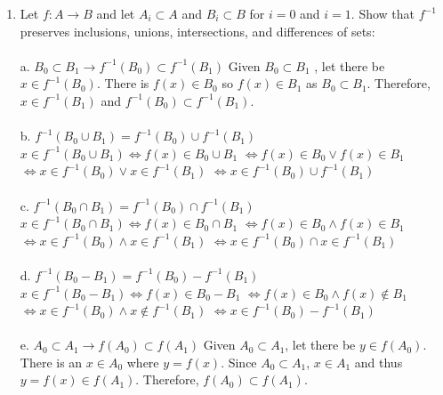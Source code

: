 \documentclass[]{article}
\begin{document}
\begin{enumerate}
    \item Let $f: A \rightarrow B$ and let $A_i \subset A$ and $B_i \subset B$ for $i=0$ and $i=1$. Show that $f^{-1}$ preserves inclusions, unions, intersections, and differences of sets:
    \\\\a. $B_0 \subset B_1 \rightarrow f^{-1}(B_0) \subset f^{-1}(B_1)$
    \newline Given $B_0 \subset B_1$ , let there be $x \in f^{-1}(B_0)$. There is $f(x) \in B_0$ so $f(x) \in B_1$ as $B_0 \subset B_1$. Therefore, $x \in f^{-1}(B_1)$ and $f^{-1}(B_0) \subset f^{-1}(B_1)$.
    \\\\b. $f^{-1}(B_0 \cup B_1) = f^{-1}(B_0) \cup f^{-1}(B_1)$
    \newline $x \in f^{-1}(B_0 \cup B_1) \iff f(x) \in B_0 \cup B_1$
    \newline $ \iff f(x) \in B_0 \lor f(x) \in B_1$
    \newline $\iff x \in f^{-1}(B_0) \lor x \in f^{-1}(B_1)$
    \newline $\iff x \in f^{-1}(B_0) \cup f^{-1}(B_1)$ %
    \\\\c. $f^{-1}(B_0 \cap B_1) =f^{-1}(B_0) \cap f^{-1}(B_1)$
    \newline $x \in f^{-1}(B_0 \cap B_1) \iff f(x) \in B_0 \cap B_1$
    \newline $\iff f(x) \in B_0 \land f(x) \in B_1$
    \newline $\iff x \in f^{-1}(B_0) \land x \in f^{-1}(B_1)$
    \newline $\iff x \in f^{-1}(B_0) \cap x \in f^{-1}(B_1)$
    \\\\d. $f^{-1}(B_0-B_1)=f^{-1}(B_0)-f^{-1}(B_1)$
    \newline $x \in f^{-1}(B_0-B_1) \iff f(x) \in B_0-B_1$
    \newline $\iff f(x) \in B_0 \land f(x) \notin B_1$
    \newline $\iff x \in f^{-1}(B_0) \land x \notin f^{-1}(B_1)$
    \newline $\iff x \in f^{-1}(B_0) - f^{-1}(B_1)$
    \\\\e. $A_0 \subset A_1 \rightarrow f(A_0) \subset f(A_1)$
    \newline Given $A_0 \subset A_1$, let there be $y \in f(A_0)$. There is an $x \in A_0$ where $y=f(x)$. Since $A_0 \subset A_1$, $x \in A_1$ and thus $y=f(x) \in f(A_1)$. Therefore, $f(A_0) \subset f(A_1)$.

\end{enumerate}
\end{document}
